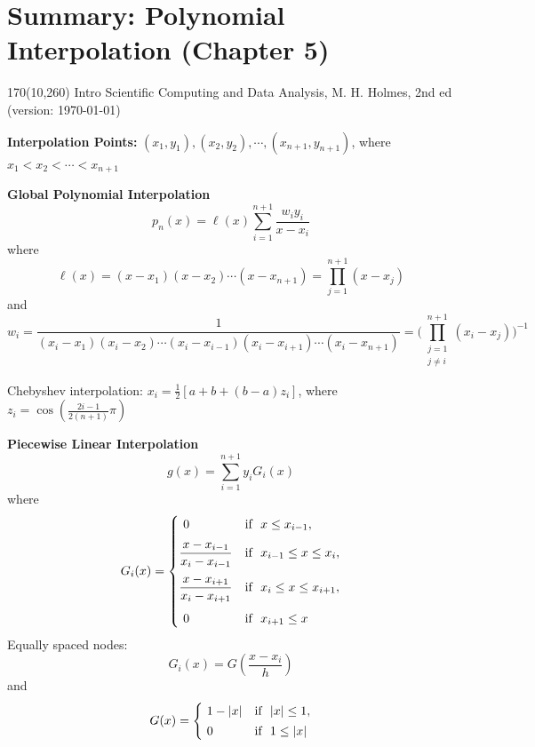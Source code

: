 \documentclass[12pt]{article}
\begin{document}
\pagestyle{empty}

\section*{Summary: Polynomial Interpolation (Chapter 5)}

\begin{textblock}{170}(10,260)
\noindent \textsf{{\small Intro Scientific Computing and Data Analysis, M. H. Holmes, 2nd ed (version: \today)}}
\end{textblock}

\bigskip\bigskip\noindent
\textbf{Interpolation Points:} $(x_1,y_1),  (x_2,y_2), \cdots , (x_{n+1},y_{n+1})$, where $x_1 < x_2 < \cdots < x_{n+1}$

\bigskip\bigskip\bigskip\noindent
\textbf{Global Polynomial Interpolation}
\[
p_n(x)= \ell(x) { \sum_{i=1}^{n+1} \frac{ w_iy_i}{x-x_i}  } 
\tag{5.8}
\]
\hspace{0.1in} where
\[
\ell(x) =(x-x_1)(x-x_2) \cdots  (x-x_{n+1}) =\prod_{j=1}^{n+1} (x-x_j)
\]
\hspace{0.1in} and
\[
w_i=\frac{1}{(x_i-x_1)(x_i-x_2) \cdots (x_i-x_{i-1})(x_i-x_{i+1})\cdots (x_i-x_{n+1})} = \Bigg ( \prod_{\substack{j=1 \\ j\neq i}}^{n+1} (x_i-x_j) \Bigg )^{-1}
\]

\bigskip\bigskip\noindent
Chebyshev interpolation: $x_i =  \frac{1}{2} \! \left[ a+b+(b-a)z_i \right ]$, where $z_i = \cos \! \left ( \frac{2i-1}{2(n+1)} \pi \right )$


\bigskip\bigskip\bigskip\bigskip\noindent
\textbf{Piecewise Linear Interpolation}
\[
g(x)=\sum_{i=1}^{n+1}y_i G_i (x)
\tag{5.15}
\]
\hspace{1in} where
\[
G_i (x)=
\begin{cases}
\,\, 0 & \text{if \,\,}  x \leq x_{i-1}, \medskip \\ 
{\displaystyle  \frac{x-x_{i-1}}{x_i-x_{i-1}} } & \text{if \,\,} x_{i-1} \leq x \leq x_i,  \medskip  \\
{\displaystyle    \frac{x-x_{i+1}}{x_i-x_{i+1}} }  & \text{if \,\,} x_{i} \leq x \leq x_{i+1},  \medskip \\
\,\, 0 & \text{if \,\,} x_{i+1} \leq x 
\label{eq:4.Gi}
\end{cases}
\]
Equally spaced nodes:
\[
G_i (x)= G \! \left( \frac{x-x_i}{h} \!  \right )
\]
\hspace{1in} and
\[
G (x)=
\begin{cases}
\,\, 1-|x| & \text{if \,\,}  |x| \leq 1, \\[0.2em]
\,\, 0 & \text{if \,\,} 1 \leq |x| 
\label{eq:inter.G}
\end{cases}
\]
\end{document}
